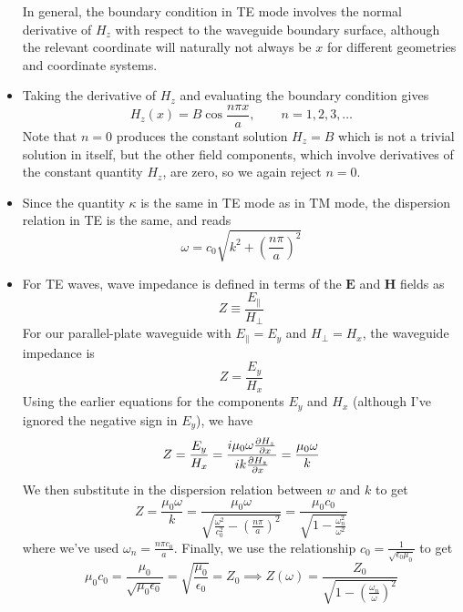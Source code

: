 \documentclass[11pt, a4paper]{article}
\renewcommand{\vec}[1]{\bm{#1}} %
\newcommand{\E}{\vec{E}}  %
\renewcommand{\H}{\vec{H}}  %
\newcommand{\ee}{\epsilon_{0}}  %
\newcommand{\mm}{\mu_{0}}  %
\newcommand{\m}{\vec{m}}  %
\begin{document}
\begin{itemize}
	In general, the boundary condition in TE mode involves the normal derivative of $ H_{z} $ with respect to the waveguide boundary surface, although the relevant coordinate will naturally not always be $ x $ for different geometries and coordinate systems.
	
	\item Taking the derivative of $ H_{z} $ and evaluating the boundary condition gives
	\begin{equation*}
		H_{z}(x) = B\cos \frac{n\pi x}{a}, \qquad n = 1, 2, 3, \ldots
	\end{equation*}
	Note that $ n = 0 $ produces the constant solution $ H_{z} = B $ which is not a trivial solution in itself, but the other field components, which involve derivatives of the constant quantity $ H_{z} $,  are zero, so we again reject $ n = 0 $. 
	
	\item Since the quantity $ \kappa $ is the same in TE mode as in TM mode, the dispersion relation in TE is the same, and reads
	\begin{equation*}
		\omega = c_{0}\sqrt{k^{2} + \left(\frac{n\pi}{a}\right)^{2}}
	\end{equation*}
	
	\item For TE waves, wave impedance is defined in terms of the $ \E $ and $ \H $ fields as
	\begin{equation*}
		Z \equiv \frac{E_{\parallel}}{H_{\perp}}
	\end{equation*}
	For our parallel-plate waveguide with $ E_{\parallel} = E_{y} $ and $ H_{\perp} = H_{x} $, the waveguide impedance is
	\begin{equation*}
		Z = \frac{E_{y}}{H_{x}}
	\end{equation*}
	Using the earlier equations for the components $ E_{y} $ and $ H_{x} $ (although I've ignored the negative sign in $ E_{y} $), we have
	\begin{equation*}
		Z = \frac{E_{y}}{H_{x}} = \frac{i\mm \omega \pdv{H_{z}}{x}}{ik \pdv{H_{z}}{x}} = \frac{\mm \omega}{k}
	\end{equation*}
	We then substitute in the dispersion relation between $ w $ and $ k $ to get
	\begin{equation*}
		Z = \frac{\mm \omega}{k} = \frac{\mm \omega}{\sqrt{\frac{\omega^{2}}{c_{0}^{2}} - \left(\frac{n\pi}{a}\right)^{2}}} = \frac{\mm c_{0}}{\sqrt{1 - \frac{\omega_{n}^{2}}{\omega^{2}}}}
	\end{equation*}
	where we've used $ \omega_{n} = \frac{n\pi c_{0}}{a} $. Finally, we use the relationship $ c_{0} = \frac{1}{\sqrt{\ee \mm}} $ to get
	\begin{equation*}
		\mm c_{0} = \frac{\mm}{\sqrt{\mm \ee}} = \sqrt{\frac{\mm}{\ee}} = Z_{0} \implies Z(\omega) = \frac{Z_{0}}{\sqrt{1 - \left(\frac{\omega_{n}}{\omega}\right)^{2}}}
	\end{equation*}
	
\end{itemize}
\end{document}
